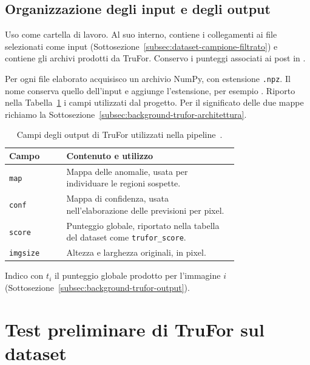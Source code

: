 \subsection{Organizzazione degli input e degli output}
\label{subsec:materiali-trufor-output}

Uso  come cartella di lavoro. Al suo interno,  contiene i collegamenti ai file selezionati come input (Sottosezione~\ref{subsec:dataset-campione-filtrato}) e  contiene gli archivi prodotti da TruFor. Conservo i punteggi associati ai post in .

Per ogni file elaborato acquisisco un archivio NumPy, con estensione \texttt{.npz}. Il nome conserva quello dell'input e aggiunge l'estensione, per esempio . Riporto nella Tabella~\ref{tab:materiali-trufor-output} i campi utilizzati dal progetto. Per il significato delle due mappe richiamo la Sottosezione~\ref{subsec:background-trufor-architettura}.

\begin{table}[htbp]
    \centering
    \small
    \caption{Campi degli output di TruFor utilizzati nella pipeline~\cite{Guillaro_2023_CVPR}.}
    \label{tab:materiali-trufor-output}
    \begin{tabular}{@{}lp{0.75\linewidth}@{}}
        \toprule
        Campo & Contenuto e utilizzo \\
        \midrule
        \texttt{map} & Mappa delle anomalie, usata per individuare le regioni sospette. \\
        \addlinespace
        \texttt{conf} & Mappa di confidenza, usata nell'elaborazione delle previsioni per pixel. \\
        \addlinespace
        \texttt{score} & Punteggio globale, riportato nella tabella del dataset come \texttt{trufor\_score}. \\
        \addlinespace
        \texttt{imgsize} & Altezza e larghezza originali, in pixel. \\
        \bottomrule
    \end{tabular}
\end{table}

Indico con $t_i$ il punteggio globale prodotto per l'immagine $i$ (Sottosezione~\ref{subsec:background-trufor-output}).

\section{Test preliminare di TruFor sul dataset}
\label{sec:metodi-trufor-benchmark}

